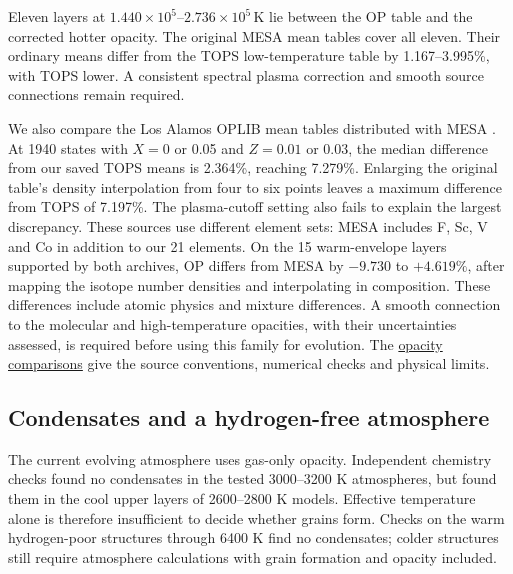 \documentclass[11pt,letterpaper]{article}
\newcommand{\doc}[2]{\href{https://github.com/oklo/ember/blob/codex/atmosphere5000-density-checks/#1}{#2}}
\begin{document}
Eleven layers at $1.440\times10^5$--$2.736\times10^5\,\mathrm{K}$ lie
between the OP table and the corrected hotter opacity. The original MESA
mean tables cover all eleven. Their ordinary means differ from the TOPS
low-temperature table by 1.167--3.995\%, with TOPS lower. A consistent
spectral plasma correction and smooth source connections remain required.

We also compare the Los Alamos OPLIB mean tables distributed with MESA
\cite{farag24}. At 1940 states with $X=0$ or 0.05 and $Z=0.01$ or 0.03,
the median difference from our saved TOPS means is 2.364\%, reaching 7.279\%.
Enlarging the original table's density interpolation from four
to six points leaves a maximum difference from TOPS of 7.197\%.
The plasma-cutoff setting also fails to explain the largest discrepancy.
These sources use different element sets: MESA includes F, Sc, V and Co in
addition to our 21 elements. On the 15 warm-envelope layers supported by both
archives, OP differs from MESA by $-9.730$ to $+4.619\%$, after mapping the
isotope number densities and interpolating in composition. These differences
include atomic physics and mixture differences. A smooth connection to the
molecular and high-temperature opacities, with their uncertainties assessed,
is required before using this family for evolution. The
\doc{docs/OPACITY_ALTERNATIVES.md}{opacity comparisons} give the source
conventions, numerical checks and physical limits.

\subsection{Condensates and a hydrogen-free atmosphere}
The current evolving atmosphere uses gas-only opacity. Independent chemistry
checks found no condensates in the tested 3000--3200 K atmospheres, but found
them in the cool upper layers of 2600--2800 K models. Effective temperature
alone is therefore insufficient to decide whether grains form. Checks on the
warm hydrogen-poor structures through 6400 K find no condensates;
colder structures still require atmosphere calculations with grain formation
and opacity included.
\end{document}
